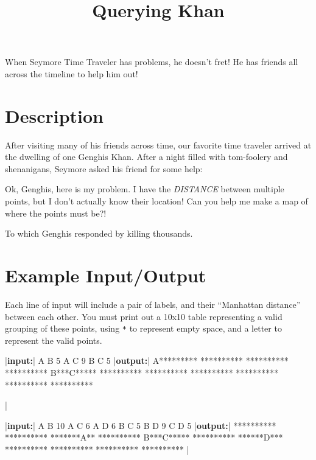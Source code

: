 \documentclass{../codeproblem}
\begin{document}
\title{Querying Khan}


\begin{flavor}
  When Seymore Time Traveler has problems, he doesn't fret! He has
  friends all across the timeline to help him out!
\end{flavor}

\section*{Description}

After visiting many of his friends across time, our favorite time
traveler arrived at the dwelling of one Genghis Khan. After a night
filled with tom-foolery and shenanigans, Seymore asked his friend for
some help:
\begin{flavor}
  Ok, Genghis, here is my problem. I have the \emph{DISTANCE} between
  multiple points, but I don't actually know their location! Can you
  help me make a map of where the points must be?!
\end{flavor}
To which Genghis responded by killing thousands.

\section*{Example Input/Output}
Each line of input will include a pair of labels, and their
``Manhattan distance'' between each other. You must print out a 10x10
table representing a valid grouping of these points,
using \texttt{*} to represent empty space, and a letter to
represent the valid points.

\begin{minipage}{.5\linewidth}
  \begin{example}
|\textbf{input:}|
A B 5
A C 9
B C 5
|\textbf{output:}|
A*********
**********
**********
**********
B***C*****
**********
**********
**********
**********
**********
**********



|\end{example}
\end{minipage}
\begin{minipage}{.5\linewidth}
\begin{example}
|\textbf{input:}|
A B 10 
A C 6
A D 6
B C 5
B D 9
C D 5
|\textbf{output:}|
**********
**********
*******A**
**********
B***C*****
**********
******D***
**********
**********
**********
**********
|\end{example}
\end{minipage}
\end{document}
